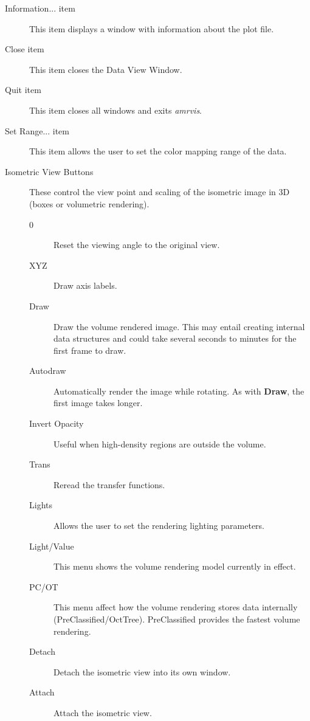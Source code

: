 \documentclass{article}
\begin{document}
\begin{description}
\item[Information... item]  This item displays a window with information
about the plot file.

\item[Close item]  This item closes the Data View Window.

\item[Quit item]  This item closes all windows and exits {\em amrvis}.

\item[Set Range... item]  This item allows the user to set the color
mapping range of the data.

\item [Isometric View Buttons]  These control the view point and scaling
of the isometric image in 3D (boxes or volumetric rendering).

\begin{description}
    \item [0]           Reset the viewing angle to the original view.
    \item [XYZ]         Draw axis labels.
    \item [Draw]        Draw the volume rendered image.  This may entail
		        creating internal data structures and could take
		        several seconds to minutes for the first frame
			to draw.
    \item [Autodraw]    Automatically render the image while rotating.
			As with {\bf Draw}, the first image takes longer.
    \item [Invert Opacity] Useful when high-density regions are outside the volume.
    \item [Trans]       Reread the transfer functions.
    \item [Lights]      Allows the user to set the rendering lighting parameters.
    \item[Light/Value]  This menu shows the volume rendering
                        model currently in effect.
    \item[PC/OT]        This menu affect how the volume rendering
                        stores data internally (PreClassified/OctTree).
			PreClassified provides the fastest volume rendering.
    \item [Detach]      Detach the isometric view into its own window.
    \item [Attach]      Attach the isometric view.
\end{description}

\end{description}
\end{document}
